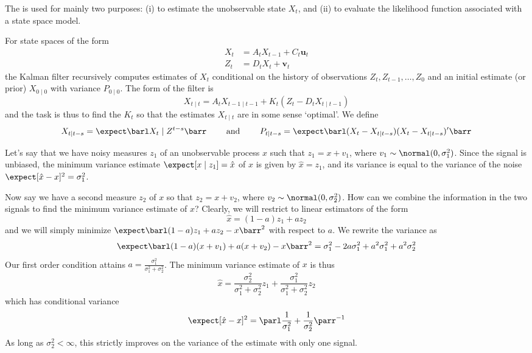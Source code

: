 \documentclass[10pt]{article}
\begin{document}
\begin{definition}
	The  is used for mainly two purposes: (i) to estimate the unobservable state $X_t$, and (ii) to evaluate the likelihood function associated with a state space model.
	
	For state spaces of the form \begin{align*} X_t &= A_t X_{t-1} + C_t \bm{u}_t \\ Z_t &= D_tX_t + \bm{v}_t\end{align*}the Kalman filter recursively computes estimates of $X_t$ conditional on the history of observations $Z_t,Z_{t-1},\dots,Z_0$ and an initial estimate (or prior) $X_{0\mid0}$ with variance $P_{0\mid0}$. The form of the filter is \[X_{t\mid t} = A_t X_{t-1 \mid t-1} + K_t (Z_t - D_t X_{t \mid t-1})\]and the task is thus to find the  $K_t$ so that the estimates $X_{t \mid t}$ are in some sense `optimal'. We define \[X_{t \mid t-s} = \expect \barl X_t \mid Z^{t-s}\barr \qquad \text{ and } \qquad P_{t \mid t-s} = \expect \barl (X_t - X_{t \mid t-s})(X_t - X_{t \mid t-s})'\barr\]
\end{definition}

\begin{example} 
	Let's say that we have noisy measures $z_1$ of an unobservable process $x$ such that $z_1 = x + v_1$, where $v_1 \sim \normal(0,\sigma_1^2)$. Since the signal is unbiased, the minimum variance estimate $\expect[x \mid z_1] = \hat{x}$ of $x$ is given by $\hat{x} = z_1$, and its variance is equal to the variance of the noise $\expect[\hat{x}-x]^2 = \sigma_1^2$. 
	
	Now say we have a second measure $z_2$ of $x$ so that $z_2 = x + v_2$, where $v_2 \sim \normal(0,\sigma_2^2)$. How can we combine the information in the two signals to find the minimum variance estimate of $x$? Clearly, we will restrict to linear estimators of the form \[\hat{x} = (1-a)z_1 + az_2\]and we will simply minimize $\expect\barl (1-a)z_1 + az_2 - x\barr^2$ with respect to $a$.  We rewrite the variance as\[\expect \barl (1-a)(x+v_1) + a(x+v_2) - x\barr^2 = \sigma_1^2 - 2a \sigma_1^2 + a^2 \sigma_1^2 + a^2 \sigma_2^2\]Our first order condition attains $a = \frac{\sigma_1^2}{\sigma_1^2 + \sigma_2^2}$. The minimum variance estimate of $x$ is thus\[\hat{x} = \frac{\sigma_2^2}{\sigma_1^2 + \sigma_2^2}z_1 + \frac{\sigma_1^2}{\sigma_1^2 + \sigma_2^2}z_2\]which has conditional variance \[\expect[\hat{x}-x]^2 = \parl \frac{1}{\sigma^2_1} + \frac{1}{\sigma^2_2}\parr^{-1}\]As long as $\sigma_2^2 < \infty$, this strictly improves on the variance of the estimate with only one signal. 
\end{example}
\end{document}
